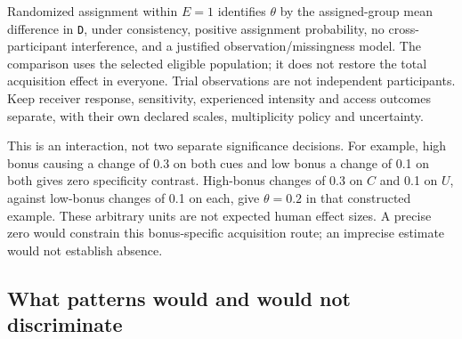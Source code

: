 \documentclass[
  american,
  11pt,
  letterpaper,
]{article}
\begin{document}
Randomized assignment within \(E=1\) identifies \(\theta\) by the assigned-group mean difference in \texttt{D}, under consistency, positive assignment probability, no cross-participant interference, and a justified observation/missingness model. The comparison uses the selected eligible population; it does not restore the total acquisition effect in everyone. Trial observations are not independent participants. Keep receiver response, sensitivity, experienced intensity and access outcomes separate, with their own declared scales, multiplicity policy and uncertainty.

This is an interaction, not two separate significance decisions. For example, high bonus causing a change of 0.3 on both cues and low bonus a change of 0.1 on both gives zero specificity contrast. High-bonus changes of 0.3 on \(C\) and 0.1 on \(U\), against low-bonus changes of 0.1 on each, give \(\theta=0.2\) in that constructed example. These arbitrary units are not expected human effect sizes. A precise zero would constrain this bonus-specific acquisition route; an imprecise estimate would not establish absence.

\subsection{What patterns would and would not discriminate}\label{what-patterns-would-and-would-not-discriminate}
\end{document}
